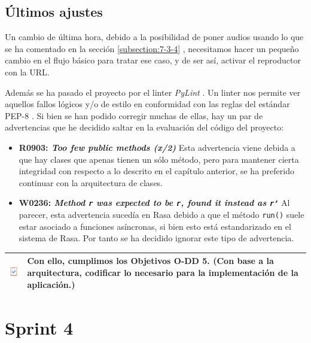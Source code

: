 \subsection{Últimos ajustes}

Un cambio de última hora, debido a la posibilidad de poner audios usando lo que se ha comentado en la sección \ref{subsection:7-3-4} , necesitamos hacer un pequeño cambio en el flujo básico para tratar ese caso, y de ser así,  activar el reproductor con la URL.

Además se ha pasado el proyecto por el linter \textit{PyLint} \cite{pylint}. Un linter nos permite ver aquellos fallos lógicos y/o de estilo en conformidad con las reglas del estándar PEP-8 \cite{pep8}. Si bien se han podido corregir muchas de ellas, hay un par de advertencias que he decidido saltar en la evaluación del código del proyecto:
\begin{itemize}
	\item \textbf{R0903: \textit{Too few public methods (x/2)}} Esta advertencia viene debida a que hay clases que apenas tienen un sólo método, pero para mantener cierta integridad con respecto a lo descrito en el capítulo anterior, se ha preferido continuar con la arquitectura de clases.
	\item \textbf{W0236: \textit{Method \texttt{r} was expected to be \texttt{r}, found it instead as \texttt{r'}}} Al parecer, esta advertencia sucedía en Rasa debido a que el método \texttt{run()} suele estar asociado a funciones asíncronas, si bien esto está estandarizado en el sistema de Rasa. Por tanto se ha decidido ignorar este tipo de advertencia.
\end{itemize}

\begin{table}[H]
	\centering
	\begin{tabularx}{\textwidth}{|>{\columncolor{mintgreen}}c>{\columncolor{mintgreen}}X|}
		\hline
		\includegraphics[width=30pt]{imagenes/Tarea_completada.png} & Con ello, cumplimos los Objetivos \textbf{O-DD 5.} (Con base a la arquitectura, codificar lo necesario para la implementación de la aplicación.) \\
		\hline
	\end{tabularx}
\end{table}

\section{Sprint 4}
